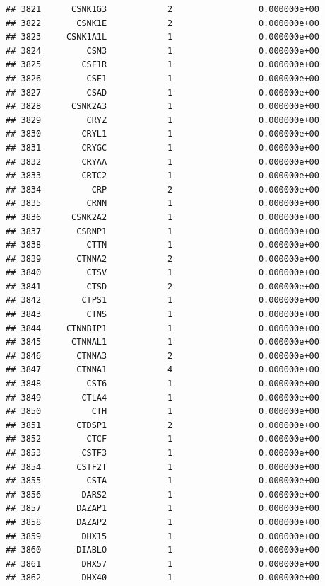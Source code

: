 \documentclass[
]{article}
\begin{document}
\begin{verbatim}
## 3821      CSNK1G3            2                 0.000000e+00
## 3822       CSNK1E            2                 0.000000e+00
## 3823     CSNK1A1L            1                 0.000000e+00
## 3824         CSN3            1                 0.000000e+00
## 3825        CSF1R            1                 0.000000e+00
## 3826         CSF1            1                 0.000000e+00
## 3827         CSAD            1                 0.000000e+00
## 3828      CSNK2A3            1                 0.000000e+00
## 3829         CRYZ            1                 0.000000e+00
## 3830        CRYL1            1                 0.000000e+00
## 3831        CRYGC            1                 0.000000e+00
## 3832        CRYAA            1                 0.000000e+00
## 3833        CRTC2            1                 0.000000e+00
## 3834          CRP            2                 0.000000e+00
## 3835         CRNN            1                 0.000000e+00
## 3836      CSNK2A2            1                 0.000000e+00
## 3837       CSRNP1            1                 0.000000e+00
## 3838         CTTN            1                 0.000000e+00
## 3839       CTNNA2            2                 0.000000e+00
## 3840         CTSV            1                 0.000000e+00
## 3841         CTSD            2                 0.000000e+00
## 3842        CTPS1            1                 0.000000e+00
## 3843         CTNS            1                 0.000000e+00
## 3844     CTNNBIP1            1                 0.000000e+00
## 3845      CTNNAL1            1                 0.000000e+00
## 3846       CTNNA3            2                 0.000000e+00
## 3847       CTNNA1            4                 0.000000e+00
## 3848         CST6            1                 0.000000e+00
## 3849        CTLA4            1                 0.000000e+00
## 3850          CTH            1                 0.000000e+00
## 3851       CTDSP1            2                 0.000000e+00
## 3852         CTCF            1                 0.000000e+00
## 3853        CSTF3            1                 0.000000e+00
## 3854       CSTF2T            1                 0.000000e+00
## 3855         CSTA            1                 0.000000e+00
## 3856        DARS2            1                 0.000000e+00
## 3857       DAZAP1            1                 0.000000e+00
## 3858       DAZAP2            1                 0.000000e+00
## 3859        DHX15            1                 0.000000e+00
## 3860       DIABLO            1                 0.000000e+00
## 3861        DHX57            1                 0.000000e+00
## 3862        DHX40            1                 0.000000e+00

\end{verbatim}
\end{document}
